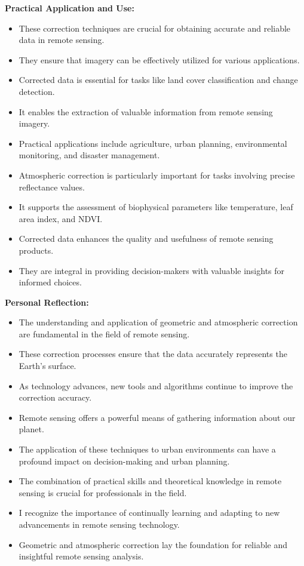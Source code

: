 \documentclass[
  letterpaper,
  DIV=11,
  numbers=noendperiod]{scrreprt}
\begin{document}
\textbf{Practical Application and Use:}

\begin{itemize}
\item
  These correction techniques are crucial for obtaining accurate and
  reliable data in remote sensing.
\item
  They ensure that imagery can be effectively utilized for various
  applications.
\item
  Corrected data is essential for tasks like land cover classification
  and change detection.
\item
  It enables the extraction of valuable information from remote sensing
  imagery.
\item
  Practical applications include agriculture, urban planning,
  environmental monitoring, and disaster management.
\item
  Atmospheric correction is particularly important for tasks involving
  precise reflectance values.
\item
  It supports the assessment of biophysical parameters like temperature,
  leaf area index, and NDVI.
\item
  Corrected data enhances the quality and usefulness of remote sensing
  products.
\item
  They are integral in providing decision-makers with valuable insights
  for informed choices.
\end{itemize}

\textbf{Personal Reflection:}

\begin{itemize}
\item
  The understanding and application of geometric and atmospheric
  correction are fundamental in the field of remote sensing.
\item
  These correction processes ensure that the data accurately represents
  the Earth's surface.
\item
  As technology advances, new tools and algorithms continue to improve
  the correction accuracy.
\item
  Remote sensing offers a powerful means of gathering information about
  our planet.
\item
  The application of these techniques to urban environments can have a
  profound impact on decision-making and urban planning.
\item
  The combination of practical skills and theoretical knowledge in
  remote sensing is crucial for professionals in the field.
\item
  I recognize the importance of continually learning and adapting to new
  advancements in remote sensing technology.
\item
  Geometric and atmospheric correction lay the foundation for reliable
  and insightful remote sensing analysis.
\end{itemize}
\end{document}

